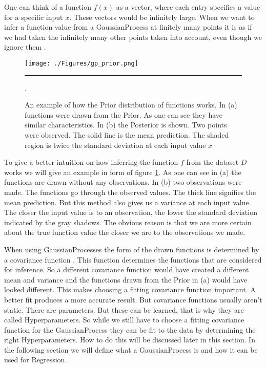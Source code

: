 One can think of a function $f(x)$ as a vector, where each entry specifies a value for a specific input $x$. These vectors would be infinitely large. When we want to infer a function value from a \Gls{GaussianProcess} at finitely many points it is as if we had taken the infinitely many other points taken into account, even though we ignore them \citep[p.\ 2]{Rasmussen:2005:GPM:1162254}. 
\begin{figure}[htbp]
	\centering
		\texttt{[image: ./Figures/gp\_prior.png]}
		\rule{35em}{0.5pt}
	\caption[\gls{Prior}]{An example of how the \gls{Prior} distribution of functions works. In (a) functions were drawn from the \gls{Prior}. As one can see they have similar characteristics. In (b) the \gls{Posterior} is shown. Two points were observed. The solid line is the mean prediction. The shaded region is twice the standard deviation at each input value $x$ \citep[p.\ 3]{Rasmussen:2005:GPM:1162254}}.
	\label{fig:gp_prior}
\end{figure}

To give a better intuition on how inferring the function $f$ from the dataset $D$ works we will give an example in form of figure \ref{fig:gp_prior}. As one can see in (a) the functions are drawn without any observations. In (b) two observations were made. The functions go through the observed values. The thick line signifies the mean prediction. But this method also gives us a variance at each input value. The closer the input value is to an observation, the lower the standard deviation indicated by the gray shadows. The obvious reason is that we are more certain about the true function value the closer we are to the observations we made.

When using \Gls{GaussianProcess}es the form of the drawn functions is determined by a covariance function \citep[p.\ 4]{Rasmussen:2005:GPM:1162254}. This function determines the functions that are considered for inference. So a different covariance function would have created a different mean and variance and the functions drawn from the \gls{Prior} in (a) would have looked different. This makes choosing a fitting covariance function important. A better fit produces a more accurate result. But covariance functions usually aren't static. There are parameters. But these can be learned, that is why they are called \gls{Hyperparameter}s. So while we still have to choose a fitting covariance function for the \Gls{GaussianProcess} they can be fit to the data by determining the right \gls{Hyperparameter}s. How to do this will be discussed later in this section. In the following section we will define what a \Gls{GaussianProcess} is and how it can be used for \gls{Regression}. 

